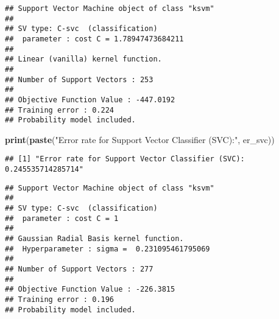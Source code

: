 \documentclass[
]{article}
\newenvironment{Shaded}{\begin{snugshade}}{\end{snugshade}}
\newcommand{\AttributeTok}[1]{\textcolor[rgb]{0.13,0.29,0.53}{#1}}
\newcommand{\CommentTok}[1]{\textcolor[rgb]{0.56,0.35,0.01}{\textit{#1}}}
\newcommand{\DecValTok}[1]{\textcolor[rgb]{0.00,0.00,0.81}{#1}}
\newcommand{\FunctionTok}[1]{\textcolor[rgb]{0.13,0.29,0.53}{\textbf{#1}}}
\newcommand{\NormalTok}[1]{#1}
\newcommand{\OtherTok}[1]{\textcolor[rgb]{0.56,0.35,0.01}{#1}}
\newcommand{\SpecialCharTok}[1]{\textcolor[rgb]{0.81,0.36,0.00}{\textbf{#1}}}
\newcommand{\StringTok}[1]{\textcolor[rgb]{0.31,0.60,0.02}{#1}}
\begin{document}
\begin{verbatim}
## Support Vector Machine object of class "ksvm" 
## 
## SV type: C-svc  (classification) 
##  parameter : cost C = 1.78947473684211 
## 
## Linear (vanilla) kernel function. 
## 
## Number of Support Vectors : 253 
## 
## Objective Function Value : -447.0192 
## Training error : 0.224 
## Probability model included.
\end{verbatim}

\begin{Shaded}
\begin{Highlighting}[]
\FunctionTok{print}\NormalTok{(}\FunctionTok{paste}\NormalTok{(}\StringTok{"Error rate for Support Vector Classifier (SVC):"}\NormalTok{, er\_svc))}
\end{Highlighting}
\end{Shaded}

\begin{verbatim}
## [1] "Error rate for Support Vector Classifier (SVC): 0.245535714285714"
\end{verbatim}

\begin{Shaded}
\end{Shaded}

\begin{verbatim}
## Support Vector Machine object of class "ksvm" 
## 
## SV type: C-svc  (classification) 
##  parameter : cost C = 1 
## 
## Gaussian Radial Basis kernel function. 
##  Hyperparameter : sigma =  0.231095461795069 
## 
## Number of Support Vectors : 277 
## 
## Objective Function Value : -226.3815 
## Training error : 0.196 
## Probability model included.
\end{verbatim}
\end{document}
